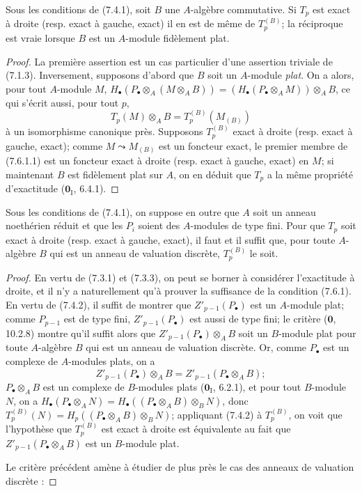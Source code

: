 \begin{proposition}[7.6.1]
Sous les conditions de \textup{(7.4.1)}, soit $B$ une $A$-algèbre commutative. Si $T_p$
est exact à droite \textup{(resp.} exact à gauche, exact) il en est de même de
$T_p^{(B)}$; la réciproque est vraie lorsque $B$ est un $A$-module fidèlement
plat.
\end{proposition}

\begin{proof}
La première assertion est un cas particulier d'une assertion triviale de
(7.1.3). Inversement, supposons d'abord que $B$ soit un $A$-module \emph{plat}. On a
alors, pour tout $A$-module $M$,
$H_\bullet(P_\bullet\otimes_A(M\otimes_A B))=(H_\bullet(P_\bullet\otimes_A M))\otimes_A B$,
ce qui s'écrit aussi, pour tout $p$,
\[
  T_p(M)\otimes_A B
  =
  T_p^{(B)}(M_{(B)})
  \tag{7.6.1.1}\label{III.7.6.1.1.fr}
\]
à un isomorphisme canonique près. Supposons $T_p^{(B)}$ exact à droite (resp.
exact à gauche, exact); comme $M\leadsto M_{(B)}$ est un foncteur exact, le
premier membre de (7.6.1.1) est un foncteur exact à droite (resp. exact à
gauche, exact) en $M$; si maintenant $B$ est fidèlement plat sur $A$, on en
déduit que $T_p$ a la même propriété d'exactitude ($\mathbf{0}_{\mathrm I}$, 6.4.1).
\end{proof}

\begin{proposition}[7.6.2]
Sous les conditions de \textup{(7.4.1)}, on suppose en outre que $A$ soit un anneau
noethérien réduit et que les $P_i$ soient des $A$-modules de type fini. Pour que
$T_p$ soit exact à droite \textup{(resp.} exact à gauche, exact), il faut et il suffit
que, pour toute $A$-algèbre $B$ qui est un anneau de valuation discrète,
$T_p^{(B)}$ le soit.
\end{proposition}

\begin{proof}
En vertu de (7.3.1) et (7.3.3), on peut se borner à considérer l'exactitude à
droite, et il n'y a naturellement qu'à prouver la suffisance de la condition
(7.6.1). En vertu de (7.4.2), il suffit de montrer que
$Z'_{p-1}(P_\bullet)$ est un $A$-module plat; comme $P_{p-1}$ est de type fini,
$Z'_{p-1}(P_\bullet)$ est aussi de type fini; le critère ($\mathbf{0}$, 10.2.8) montre
qu'il suffit alors que $Z'_{p-1}(P_\bullet)\otimes_A B$ soit un $B$-module plat
pour toute $A$-algèbre $B$ qui est un anneau de valuation discrète. Or, comme
$P_\bullet$ est un complexe de $A$-modules plats, on a
\[
  Z'_{p-1}(P_\bullet)\otimes_A B
  =
  Z'_{p-1}(P_\bullet\otimes_A B);
\]
$P_\bullet\otimes_A B$ est un complexe de $B$-modules plats
($\mathbf{0}_{\mathrm I}$, 6.2.1), et pour tout $B$-module $N$, on a
$H_\bullet(P_\bullet\otimes_A N)=H_\bullet((P_\bullet\otimes_A B)\otimes_B N)$,
donc $T_p^{(B)}(N)=H_p((P_\bullet\otimes_A B)\otimes_B N)$;
appliquant (7.4.2) à $T_p^{(B)}$, on voit que l'hypothèse que $T_p^{(B)}$ est
exact à droite est équivalente au fait que $Z'_{p-1}(P_\bullet\otimes_A B)$ est
un $B$-module plat.

Le critère précédent amène à étudier de plus près le cas des anneaux de
valuation discrète :
\end{proof}

